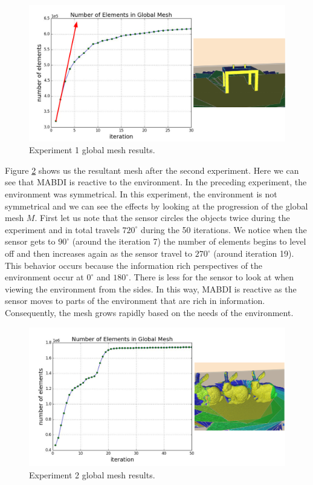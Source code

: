 \begin{figure}[h]%
\centering
  \includegraphics[width=\textwidth]{figures/diagram_run1_gm.pdf}
  \caption{Experiment 1 global mesh results.}
  \label{fig:gm_1}
\end{figure}

Figure \ref{fig:gm_2} shows us the resultant mesh after the second experiment.
Here we can see that MABDI is reactive to the environment. In the preceding
experiment, the environment was symmetrical. In this experiment, the environment
is not symmetrical and we can see the effects by looking at the progression of
the global mesh $M$. First let us note that the sensor circles the objects twice
during the experiment and in total travels $720^{\circ}$ during the 50
iterations. We notice when the sensor gets to $90^{\circ}$ (around the iteration
7) the number of elements begins to level off and then increases again as the
sensor travel to $270^{\circ}$ (around iteration 19). This behavior occurs
because the information rich perspectives of the environment occur at
$0^{\circ}$ and $180^{\circ}$. There is less for the sensor to look at when
viewing the environment from the sides. In this way, MABDI is reactive as the
sensor moves to parts of the environment that are rich in information.
Consequently, the mesh grows rapidly based on the needs of the environment.

\begin{figure}[h]%
\centering
  \includegraphics[width=\textwidth]{figures/diagram_run2_gm.pdf}
  \caption{Experiment 2 global mesh results.}
  \label{fig:gm_2}
\end{figure}

